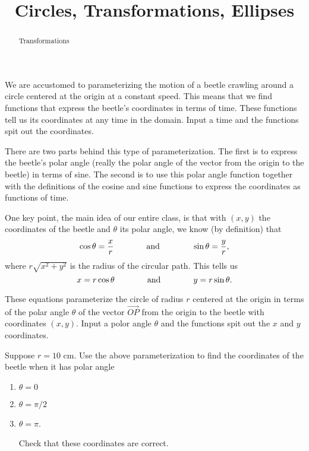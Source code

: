 \documentclass{ximera}
\title{Circles, Transformations, Ellipses}
\begin{document}
\begin{abstract}
Transformations
\end{abstract}
\maketitle



We are accustomed to parameterizing the motion of a beetle crawling around a circle centered at the origin at a constant speed. This means that we find functions that express the beetle's coordinates in terms of time. These functions tell us its coordinates at any time in the domain. Input a time and the functions spit out the coordinates.

There are two parts behind this type of parameterization. The first is to express the beetle's polar angle (really the polar angle of the vector from the origin to the beetle) in terms of sine. The second is to use this polar angle function together with the definitions of the cosine and sine functions to express the coordinates as functions of time.

One key point, the main idea of our entire class, is that with $(x,y)$ the coordinates of the beetle and $\theta$ its polar angle, we know (by definition) that
\[
   \cos\theta = \frac{x}{r} \hskip 0.5 in \text{ and } \hskip 0.5 in \sin\theta = \frac{y}{r},
\] 
where $r\sqrt{x^2+y^2}$ is the radius of the circular path. This tells us
\[
   x = r \cos \theta \hskip 0.5 in \text{ and } \hskip 0.5 in  y = r\sin \theta.
\]

These equations parameterize the circle of radius $r$ centered at the origin in terms of the polar angle $\theta$ of the vector $\overrightarrow{OP}$ from the origin to the beetle with coordinates $(x,y)$. Input a polor angle $\theta$ and the functions spit out the $x$ and $y$ coordinates.

\begin{question} \label{Q9edDEFRLERr3}
Suppose $r=10$ cm. Use the above parameterization to find the coordinates of the beetle when it has polar angle
\begin{enumerate}
\item $\theta = 0$

\item $\theta = \pi/2$

\item $\theta = \pi$.

Check that these coordinates are correct.
\end{enumerate}
\end{question}
\end{document}
